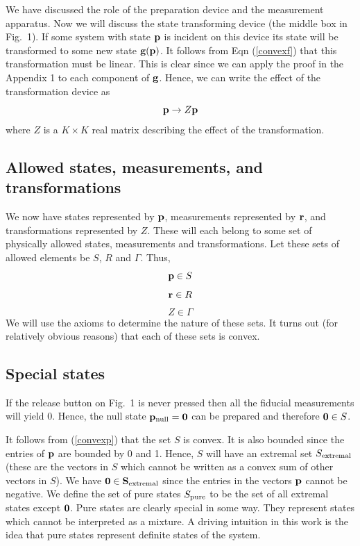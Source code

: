 \documentclass[10pt,twocolumn]{article}
\begin{document}
We have discussed the role of the preparation device and the measurement
apparatus.  Now we will discuss the state transforming device (the
middle box in Fig.\ 1). If some system with state ${\bf p}$ is incident on this
device its state will be transformed to some new state ${\bf g}({\bf p})$.  It
follows from Eqn (\ref{convexf}) that this transformation must be
linear.  This is clear since we can apply the proof in the Appendix 1 to
each component of ${\bf g}$.  Hence, we can write the effect of the
transformation device as
\begin{equation}
{\bf p} \rightarrow Z {\bf p}
\end{equation}
where $Z$ is a $K\times K$ real matrix describing the effect of the
transformation.

\subsection{Allowed states, measurements, and transformations}

We now have states represented by $\bf p$, measurements represented by
$\bf r$, and transformations represented by $Z$.
These will each belong to some set
of physically allowed states, measurements and transformations. Let these
sets of allowed elements be $S$, $R$ and $\Gamma$.  Thus,
\begin{equation}
{\bf p} \in S
\end{equation}
\begin{equation}
{\bf r} \in R
\end{equation}
\begin{equation}
Z \in \Gamma
\end{equation}
We will use the axioms to determine the nature of these sets. It
turns out (for relatively obvious reasons) that each of these sets is convex.

\subsection{Special states}\label{specialstates}

If the release button on Fig.\ 1 is never pressed then all the fiducial
measurements will yield 0.  Hence, the null state ${\bf p}_{\rm null}={\bf 0}$
can be prepared and therefore ${\bf 0}\in S$.

It follows from (\ref{convexp}) that the set $S$ is convex. It is also
bounded since the entries of ${\bf p}$ are bounded by 0 and 1. Hence,
$S$ will have an extremal set $S_{\rm extremal}$ (these are the vectors in $S$
which cannot be written as a convex sum of other vectors in $S$).
We have  $\bf 0\in S_{\rm extremal}$ since the entries in the vectors
$\bf p$ cannot be negative.  We define the set of pure states $S_{\rm
pure}$ to be the set of all extremal states except $\bf 0$.
Pure states are clearly special in some way. They represent states which
cannot be interpreted as a mixture.  A driving intuition in this work
is the idea that pure states represent definite states of the system.
\end{document}
